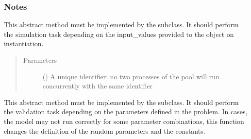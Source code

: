 \documentclass[letterpaper,10pt,english,openany,oneside]{sphinxmanual}
\begin{document}
\begin{fulllineitems}
\subsubsection*{Notes}

\begin{fulllineitems}
\label{\detokenize{pygpc.testfunctions:pygpc.testfunctions.testfunctions.Welch1992.simulate}}
This abstract method must be implemented by the subclass.
It should perform the simulation task depending on the input\_values provided to the object on instantiation.
\begin{quote}\begin{description}
\item[{Parameters}] \leavevmode
{} () \textendash{} A unique identifier; no two processes of the pool will run concurrently with the same identifier

\end{description}\end{quote}

\end{fulllineitems}


\begin{fulllineitems}
\label{\detokenize{pygpc.testfunctions:pygpc.testfunctions.testfunctions.Welch1992.validate}}
This abstract method must be implemented by the subclass.
It should perform the validation task depending on the parameters defined in the problem.
In cases, the model may not run correctly for some parameter combinations, this function changes the definition
of the random parameters and the constants.

\end{fulllineitems}


\end{fulllineitems}

\end{document}
